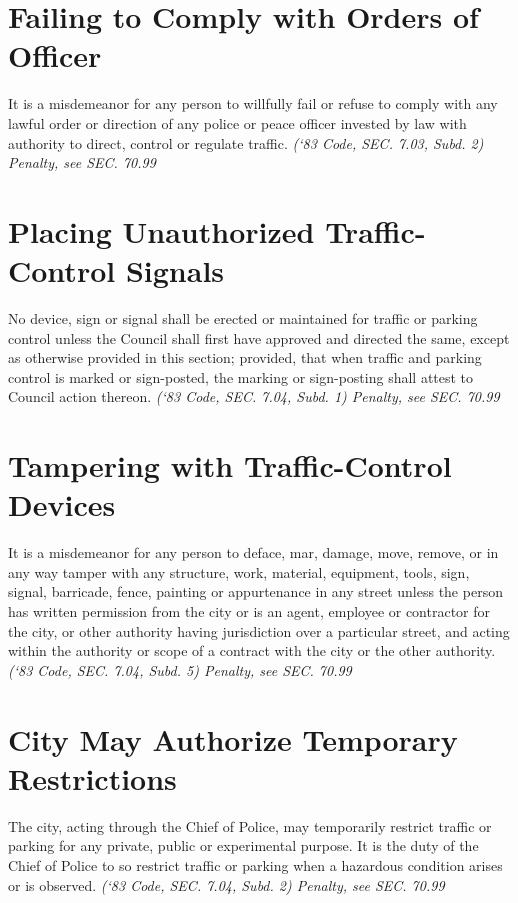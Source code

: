 \documentclass[code.tex]{subfiles}
\begin{document}
\section{Failing to Comply with Orders of Officer}
It is a misdemeanor for any person to willfully fail or refuse to comply with any lawful order or direction of any police or peace officer invested by law with authority to direct, control or regulate traffic.\newline
\emph{(‘83 Code, SEC. 7.03, Subd. 2)  Penalty, see SEC. 70.99}
\section{Placing Unauthorized Traffic-Control Signals}
No device, sign or signal shall be erected or maintained for traffic or parking control unless the Council shall first have approved and directed the same, except as otherwise provided in this section; provided, that when traffic and parking control is marked or sign-posted, the marking or sign-posting shall attest to Council action thereon.\newline
\emph{(‘83 Code, SEC. 7.04, Subd. 1)  Penalty, see SEC. 70.99}
\section{Tampering with Traffic-Control Devices}
It is a misdemeanor for any person to deface, mar, damage, move, remove, or in any way tamper with any structure, work, material, equipment, tools, sign, signal, barricade, fence, painting or appurtenance in any street unless the person has written permission from the city or is an agent, employee or contractor for the city, or other authority having jurisdiction over a particular street, and acting within the authority or scope of a contract with the city or the other authority.\newline
\emph{(‘83 Code, SEC. 7.04, Subd. 5)  Penalty, see SEC. 70.99}
\section{City May Authorize Temporary Restrictions}
The city, acting through the Chief of Police, may temporarily restrict traffic or parking for any private, public or experimental purpose.  It is the duty of the Chief of Police to so restrict traffic or parking when a hazardous condition arises or is observed.\newline
\emph{(‘83 Code, SEC. 7.04, Subd. 2)  Penalty, see SEC. 70.99}
\end{document}
